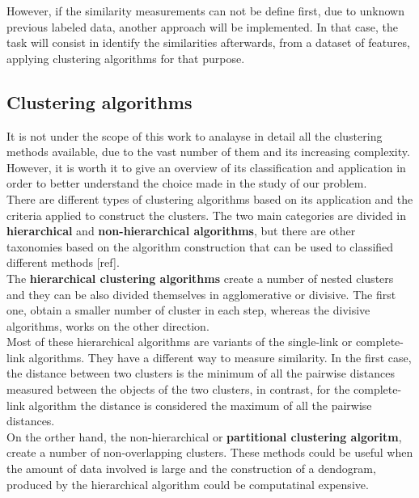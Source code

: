 However, if the similarity measurements can not be define first, due to unknown previous labeled data, another approach will be implemented. In that case, the task will consist in identify the similarities afterwards, from a dataset of features, applying clustering algorithms for that purpose.

\subsection{Clustering algorithms}

It is not under the scope of this work to analayse in detail all the clustering methods available, due to the vast number of them and its increasing complexity. However, it is worth it to give an overview of its classification and application in order to better understand the choice made in the study of our problem.\\

There are different types of clustering algorithms based on its application and the criteria applied to construct the clusters. The two main categories are divided in \textbf{hierarchical} and \textbf{non-hierarchical algorithms}, but there are other taxonomies based on the algorithm construction that can be used to classified different methods [ref].\\

The \textbf{hierarchical clustering algorithms} create a number of nested clusters and they can be also divided themselves in agglomerative or divisive. The first one, obtain a smaller number of cluster in each step, whereas the divisive algorithms, works on the other direction.\\

Most of these hierarchical algorithms are variants of the single-link or complete-link algorithms. They have a different way to measure similarity. In the first case, the distance between two clusters is the minimum of all the pairwise distances measured between the objects of the two clusters, in contrast, for the complete-link algorithm the distance is considered the maximum of all the pairwise distances.\\

On the orther hand, the non-hierarchical or \textbf{partitional clustering algoritm}, create a number of non-overlapping clusters. These methods could be useful when the amount of data involved is large and the construction of a dendogram, produced by the hierarchical algorithm could be computatinal expensive.\\

